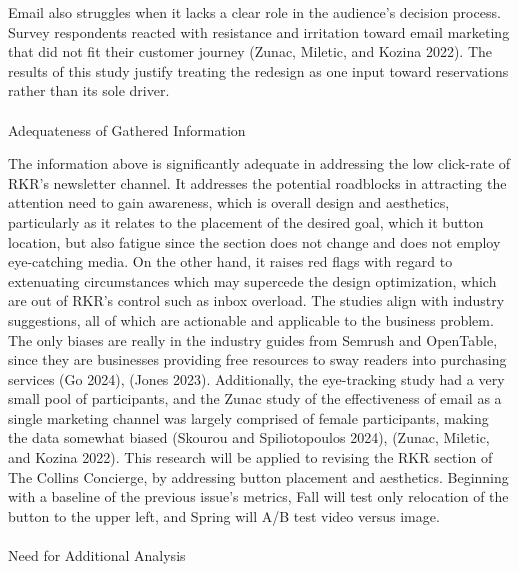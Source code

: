 \documentclass[
  12pt,
  letterpaper,
  DIV=11,
  numbers=noendperiod]{scrartcl}
\makeatletter
\let\oldparagraph\paragraph
\renewcommand{\paragraph}{
    \@ifstar
      \xxxParagraphStar
      \xxxParagraphNoStar
  }
\newcommand{\xxxParagraphStar}[1]{\oldparagraph*{#1}\mbox{}}
\newcommand{\xxxParagraphNoStar}[1]{\oldparagraph{#1}\mbox{}}
\makeatother
\begin{document}
Email also struggles when it lacks a clear role in the audience's
decision process. Survey respondents reacted with resistance and
irritation toward email marketing that did not fit their customer
journey (Zunac, Miletic, and Kozina 2022). The results of this study
justify treating the redesign as one input toward reservations rather
than its sole driver.

\paragraph{Adequateness of Gathered
Information}\label{adequateness-of-gathered-information}

The information above is significantly adequate in addressing the low
click-rate of RKR's newsletter channel. It addresses the potential
roadblocks in attracting the attention need to gain awareness, which is
overall design and aesthetics, particularly as it relates to the
placement of the desired goal, which it button location, but also
fatigue since the section does not change and does not employ
eye-catching media. On the other hand, it raises red flags with regard
to extenuating circumstances which may supercede the design
optimization, which are out of RKR's control such as inbox overload. The
studies align with industry suggestions, all of which are actionable and
applicable to the business problem. The only biases are really in the
industry guides from Semrush and OpenTable, since they are businesses
providing free resources to sway readers into purchasing services (Go
2024), (Jones 2023). Additionally, the eye-tracking study had a very
small pool of participants, and the Zunac study of the effectiveness of
email as a single marketing channel was largely comprised of female
participants, making the data somewhat biased (Skourou and
Spiliotopoulos 2024), (Zunac, Miletic, and Kozina 2022). This research
will be applied to revising the RKR section of The Collins Concierge, by
addressing button placement and aesthetics. Beginning with a baseline of
the previous issue's metrics, Fall will test only relocation of the
button to the upper left, and Spring will A/B test video versus image.

\paragraph{Need for Additional
Analysis}\label{need-for-additional-analysis}
\end{document}
